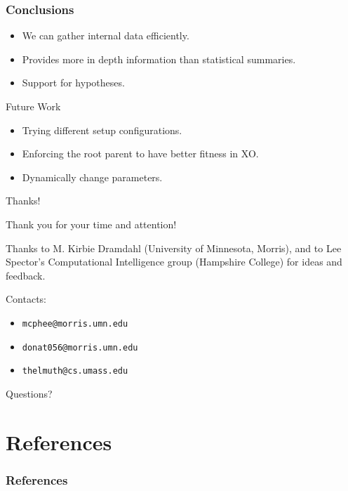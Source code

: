 \documentclass{beamer}
\newcommand{\linespace}{\vskip 0.25cm}
\begin{document}
\begin{frame}
\frametitle{Conclusions}

\begin{itemize}
\item We can gather internal data efficiently.
\item Provides more in depth information than statistical summaries. 
\item Support for hypotheses.
\end{itemize}
\linespace
\linespace
\linespace
\linespace

Future Work
\begin{itemize}
\item Trying different setup configurations.
\item Enforcing the root parent to have better fitness in XO.
\item Dynamically change parameters.
\end{itemize}
\end{frame}

\begin{frame}{Thanks!}
	
	Thank you for your time and attention!

	\linespace
	
	Thanks to M. Kirbie Dramdahl (University of Minnesota, Morris), and to Lee Spector's Computational Intelligence group (Hampshire College) for ideas and feedback.
	
	\linespace
	
	Contacts:  
	\begin{itemize}
		\item \texttt{mcphee@morris.umn.edu}
		\item \texttt{donat056@morris.umn.edu}
		\item \texttt{thelmuth@cs.umass.edu}
	\end{itemize}
	
	\linespace
	\linespace
	
	\begin{center}
	{\huge Questions?}
	\end{center}
\end{frame}

\section*{References}

\begin{frame} 
\frametitle{References}

{\tiny }
\end{frame} 
\end{document}

